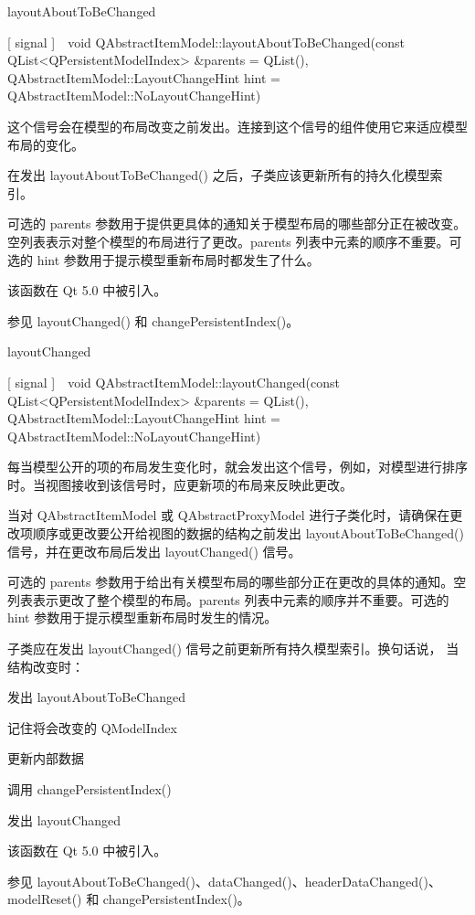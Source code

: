 layoutAboutToBeChanged

[ signal ] void QAbstractItemModel::layoutAboutToBeChanged(const QList<QPersistentModelIndex> \&parents = QList(), QAbstractItemModel::LayoutChangeHint hint = QAbstractItemModel::NoLayoutChangeHint)

这个信号会在模型的布局改变之前发出。连接到这个信号的组件使用它来适应模型布局的变化。

在发出 layoutAboutToBeChanged() 之后，子类应该更新所有的持久化模型索引。

可选的 parents 参数用于提供更具体的通知关于模型布局的哪些部分正在被改变。空列表表示对整个模型的布局进行了更改。parents 列表中元素的顺序不重要。可选的 hint 参数用于提示模型重新布局时都发生了什么。

该函数在 Qt 5.0 中被引入。

参见 layoutChanged() 和 changePersistentIndex()。

layoutChanged

[ signal ] void QAbstractItemModel::layoutChanged(const QList<QPersistentModelIndex> \&parents = QList(), QAbstractItemModel::LayoutChangeHint hint = QAbstractItemModel::NoLayoutChangeHint)

每当模型公开的项的布局发生变化时，就会发出这个信号，例如，对模型进行排序时。当视图接收到该信号时，应更新项的布局来反映此更改。

当对 QAbstractItemModel 或 QAbstractProxyModel 进行子类化时，请确保在更改项顺序或更改要公开给视图的数据的结构之前发出 layoutAboutToBeChanged() 信号，并在更改布局后发出 layoutChanged() 信号。

可选的 parents 参数用于给出有关模型布局的哪些部分正在更改的具体的通知。空列表表示更改了整个模型的布局。parents 列表中元素的顺序并不重要。可选的 hint 参数用于提示模型重新布局时发生的情况。

子类应在发​​出 layoutChanged() 信号之前更新所有持久模型索引。换句话说，
当结构改变时：

\begin{compactitem}
\item 发出 layoutAboutToBeChanged
\item 记住将会改变的 QModelIndex
\item 更新内部数据
\item 调用 changePersistentIndex()
\item 发出 layoutChanged
\end{compactitem}

该函数在 Qt 5.0 中被引入。

参见 layoutAboutToBeChanged()、dataChanged()、headerDataChanged()、modelReset() 和 changePersistentIndex()。

